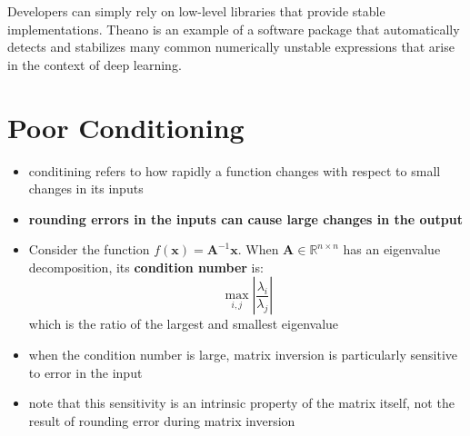 \documentclass[11pt, twocolumn]{report}
\def\realnumbers{\mathbb{R}}
\begin{document}
Developers can simply rely on low-level libraries that provide stable
implementations.  Theano is an example of a software package that automatically
detects and stabilizes many common numerically unstable expressions that arise
in the context of deep learning.

\section{Poor Conditioning}
\begin{itemize}
  \item conditining refers to how rapidly a function changes with respect to
    small changes in its inputs
  \item \textbf{rounding errors in the inputs can cause large changes in the
      output}
  \item Consider the function $f(\bm{x}) = \bm{A}^{-1}\bm{x}$. When $\bm{A} \in
    \realnumbers^{n \times n}$ has an eigenvalue decomposition, its
    \textbf{condition number} is:
    \begin{equation}
      \max_{i, j} \left|\frac{\lambda_i}{\lambda_j}\right|
    \end{equation}
    which is the ratio of the largest and smallest eigenvalue
  \item when the condition number is large, matrix inversion is particularly
    sensitive to error in the input
  \item note that this sensitivity is an intrinsic property of the matrix
    itself, not the result of rounding error during matrix inversion
\end{itemize}
\end{document}
